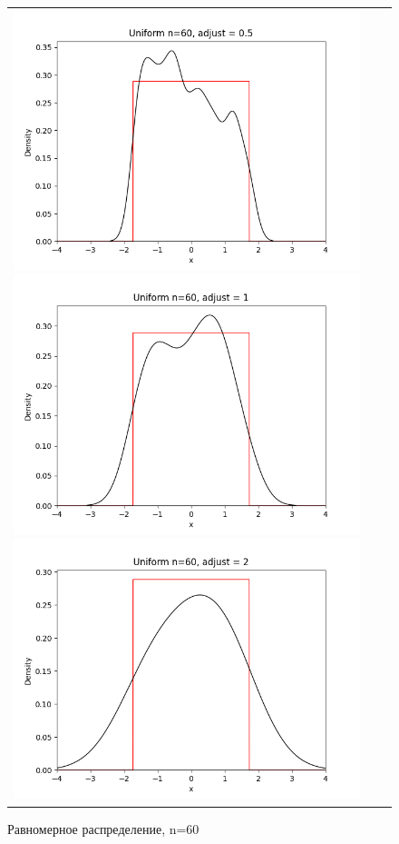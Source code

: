\begin{figure}[H]
	\begin{tabular}{ccc}
		\includegraphics[scale=0.33]{uniform_n60_adjust0.5.png}
		\includegraphics[scale=0.33]{uniform_n60_adjust1.png}
		\includegraphics[scale=0.33]{uniform_n60_adjust2.png}
	\end{tabular}
	\caption{Равномерное распределение, n=60}
\end{figure}

